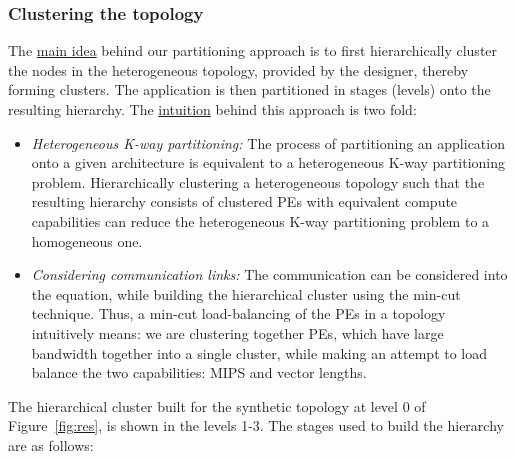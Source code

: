 \subsubsection{Clustering the topology}
\label{sec:clustering-topology}

The \underline{main idea} behind our partitioning approach is to first
hierarchically cluster the nodes in the heterogeneous topology, provided
by the designer, thereby forming clusters. The
application is then partitioned in stages (levels) onto the resulting
hierarchy. The \underline{intuition} behind this approach is two fold:

\begin{itemize}

\item \textit{Heterogeneous K-way partitioning:} The process of
  partitioning an application onto a given architecture is equivalent to
  a heterogeneous K-way partitioning problem. Hierarchically clustering
  a heterogeneous topology such that the resulting hierarchy consists of
  clustered PEs with equivalent compute capabilities can reduce the
  heterogeneous K-way partitioning problem to a homogeneous one.

\item \textit{Considering communication links:} The communication can be
  considered into the equation, while building the hierarchical cluster
  using the min-cut technique. Thus, a min-cut load-balancing of the PEs
  in a topology intuitively means: we are clustering together PEs, which
  have large bandwidth together into a single cluster, while
  making an attempt to load balance the two capabilities: MIPS and
  vector lengths.

\end{itemize}

The hierarchical cluster built for the synthetic topology at level 0 of
Figure~\ref{fig:res}, is shown in the levels 1-3. The stages used to
build the hierarchy are as follows:

